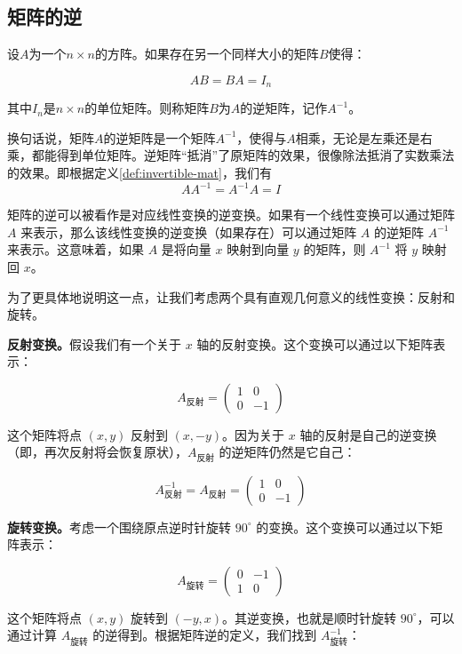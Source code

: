 \subsection{矩阵的逆}

\begin{definition} \label{def:invertible-mat}
    设$A$为一个$n \times n$的方阵。如果存在另一个同样大小的矩阵$B$使得：

$$AB = BA = I_n$$

其中$I_n$是$n \times n$的单位矩阵。则称矩阵$B$为$A$的逆矩阵，记作$A^{-1}$。
\end{definition}

换句话说，矩阵$A$的逆矩阵是一个矩阵$A^{-1}$，使得与$A$相乘，无论是左乘还是右乘，都能得到单位矩阵。逆矩阵“抵消”了原矩阵的效果，很像除法抵消了实数乘法的效果。即根据定义\ref{def:invertible-mat}，我们有
$$
A A^{-1}=A^{-1} A=I
$$

矩阵的逆可以被看作是对应线性变换的逆变换。如果有一个线性变换可以通过矩阵 \(A\) 来表示，那么该线性变换的逆变换（如果存在）可以通过矩阵 \(A\) 的逆矩阵 \(A^{-1}\) 来表示。这意味着，如果 \(A\) 是将向量 \(x\) 映射到向量 \(y\) 的矩阵，则 \(A^{-1}\) 将 \(y\) 映射回 \(x\)。

为了更具体地说明这一点，让我们考虑两个具有直观几何意义的线性变换：反射和旋转。

\textbf{反射变换。}假设我们有一个关于 \(x\) 轴的反射变换。这个变换可以通过以下矩阵表示：

\[ A_{\text{反射}} = \begin{pmatrix} 1 & 0 \\ 0 & -1 \end{pmatrix} \]

这个矩阵将点 \( (x, y) \) 反射到 \( (x, -y) \)。因为关于 \(x\) 轴的反射是自己的逆变换（即，再次反射将会恢复原状），\(A_{\text{反射}}\) 的逆矩阵仍然是它自己：

\[ A_{\text{反射}}^{-1} = A_{\text{反射}} = \begin{pmatrix} 1 & 0 \\ 0 & -1 \end{pmatrix} \]

\textbf{旋转变换。}考虑一个围绕原点逆时针旋转 \(90^\circ\) 的变换。这个变换可以通过以下矩阵表示：

\[ A_{\text{旋转}} = \begin{pmatrix} 0 & -1 \\ 1 & 0 \end{pmatrix} \]

这个矩阵将点 \( (x, y) \) 旋转到 \( (-y, x) \)。其逆变换，也就是顺时针旋转 \(90^\circ\)，可以通过计算 \(A_{\text{旋转}}\) 的逆得到。根据矩阵逆的定义，我们找到 \(A_{\text{旋转}}^{-1}\)：

